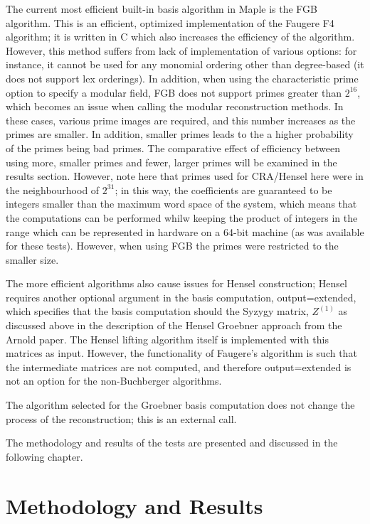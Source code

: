 \documentclass[letterpaper,12pt,titlepage,oneside,final]{book}
\begin{document}
The current most efficient built-in basis algorithm in Maple is the FGB algorithm.  This is an efficient, optimized implementation of the Faugere F4 algorithm; it is written in C which also increases the efficiency of the algorithm.  However, this method suffers from lack of implementation of various options: for instance, it cannot be used for any monomial ordering other than degree-based (it does not support lex orderings).  In addition, when using the characteristic prime option to specify a modular field, FGB does not support primes greater than ${2^{16}}$, which becomes an issue when calling the modular reconstruction methods.  In these cases, various prime images are required, and this number increases as the primes are smaller.  In addition, smaller primes leads to the a higher probability of the primes being bad primes.  The comparative effect of efficiency between using more, smaller primes and fewer, larger primes will be examined in the results section.  However, note here that primes used for CRA/Hensel here were in the neighbourhood of ${2^{31}}$; in this way, the coefficients are guaranteed to be integers smaller than the maximum word space of the system, which means that the computations can be performed whilw keeping the product of integers in the range which can be represented in hardware on a 64-bit machine (as was available for these tests).  However, when using FGB the primes were restricted to the smaller size.

The more efficient algorithms also cause issues for Hensel construction; Hensel requires another optional argument in the basis computation, output=extended, which specifies that the basis computation should the Syzygy matrix, ${Z^{(1)}}$ as discussed above in the description of the Hensel Groebner approach from the Arnold paper.  The Hensel lifting algorithm itself is implemented with this matrices as input.  However, the functionality of Faugere's algorithm is such that the intermediate matrices are not computed, and therefore output=extended is not an option for the non-Buchberger algorithms.  

The algorithm selected for the Groebner basis computation does not change the process of the reconstruction; this is an external call.



The methodology and results of the tests are presented and discussed in the following chapter.

\chapter{Methodology and Results}
\end{document}
